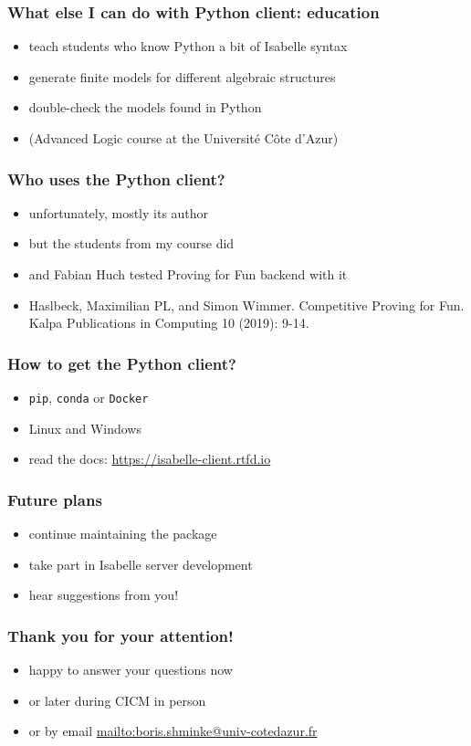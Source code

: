 \documentclass{beamer}
\begin{document}
\begin{frame}[t]
\frametitle{What else I can do with Python client: education}
\begin{itemize}
\item teach students who know Python a bit of Isabelle syntax
\item generate finite models for different algebraic structures
\item double-check the models found in Python
\item (Advanced Logic course at the Université Côte d'Azur)
\end{itemize}
\end{frame}
\begin{frame}[t]
\frametitle{Who uses the Python client?}
\begin{itemize}
\item unfortunately, mostly its author
\item but the students from my course did
\item and Fabian Huch tested Proving for Fun backend with it
\item Haslbeck, Maximilian PL, and Simon Wimmer. Competitive Proving for Fun. Kalpa Publications in Computing 10 (2019): 9-14.
\end{itemize}
\end{frame}
\begin{frame}[t]
\frametitle{How to get the Python client?}
\begin{itemize}
\item \texttt{pip}, \texttt{conda} or \texttt{Docker}
\item Linux and Windows
\item read the docs: \url{https://isabelle-client.rtfd.io}
\end{itemize}
\end{frame}
\begin{frame}[t]
\frametitle{Future plans}
\begin{itemize}
\item continue maintaining the package
\item take part in Isabelle server development
\item hear suggestions from you!
\end{itemize}
\end{frame}
\begin{frame}[t]
\frametitle{Thank you for your attention!}
\begin{itemize}
\item happy to answer your questions now
\item or later during CICM in person
\item or by email \url{mailto:boris.shminke@univ-cotedazur.fr}
\end{itemize}
\end{frame}
\end{document}
